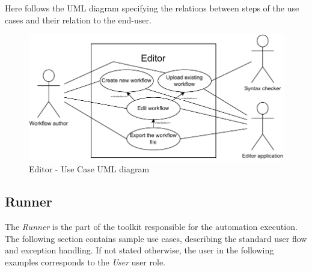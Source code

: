Here follows the UML diagram specifying the relations between steps of the use cases and their relation to the end-user.

\begin{figure}[h!]
    \includegraphics{./img/editorUC.pdf}
    \caption{Editor - Use Case UML diagram}
\end{figure}

\subsection{Runner}

The \textit{Runner} is the part of the toolkit responsible for the automation execution.
The following section contains sample use cases, describing the standard user flow and exception handling.
If not stated otherwise, the user in the following examples corresponds to the \textit{User} user role. \

\setcounter{usecases}{1}

\def \usecase {Use Case \numb{usecases}}

